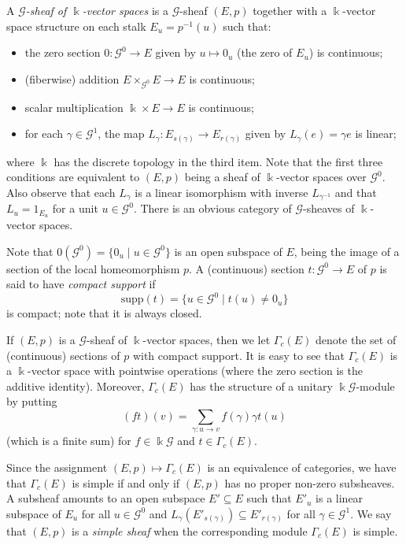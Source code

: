 \documentclass[11pt,reqno]{amsart}
\theoremstyle{plain}
\numberwithin{equation}{section}
\begin{document}
A \emph{$\mathscr G$-sheaf of $\Bbbk$-vector spaces} is a $\mathscr G$-sheaf $(E,p)$ together with a $\Bbbk$-vector space structure on each stalk $E_u=p^{-1}(u)$ such that:
\begin{itemize}
\item the zero section $0\colon \mathscr G^0\to E$ given by $u\mapsto 0_u$ (the zero of $E_u$) is continuous;
\item (fiberwise) addition $E\times_{\mathscr G^0} E\to E$ is continuous;
\item scalar multiplication $\Bbbk \times E\to E$ is continuous;
\item for each $\gamma\in \mathscr G^1$, the map $L_{\gamma}\colon E_{s(\gamma)}\to E_{r(\gamma)}$ given by $L_{\gamma}(e) = \gamma e$ is linear;
\end{itemize}
where $\Bbbk$ has the discrete topology in the third item.
Note that the first three conditions are equivalent to $(E,p)$ being a sheaf of $\Bbbk$-vector spaces over $\mathscr G^0$.  Also observe that each $L_{\gamma}$ is a linear isomorphism with inverse $L_{\gamma^{-1}}$ and that $L_u = 1_{E_u}$ for a unit $u\in \mathscr G^0$.  There is an obvious category of $\mathscr G$-sheaves of $\Bbbk$-vector spaces.

Note that $0(\mathscr G^0) = \{0_u\mid u\in \mathscr G^0\}$ is an open subspace of $E$, being the image of a section of the local homeomorphism $p$.  A (continuous) section $t\colon \mathscr G^0\to E$ of $p$ is said to have \emph{compact support} if \[\mathrm{supp}(t) =\{u\in \mathscr G^0\mid t(u)\neq 0_u\}\] is compact; note that it is always closed.

If $(E,p)$ is a $\mathscr G$-sheaf of $\Bbbk$-vector spaces, then we let $\Gamma_c(E)$ denote the set of  (continuous) sections of $p$ with compact support.  It is easy to see that $\Gamma_c(E)$ is a $\Bbbk$-vector space with pointwise operations (where the zero section is the additive identity).  Moreover, $\Gamma_c(E)$ has the structure of a unitary $\Bbbk \mathscr G$-module by putting
\begin{equation}\label{eq:module.action.sheaf}
(ft)(v) = \sum_{\gamma\colon u\to v} f(\gamma)\gamma t(u)
\end{equation}
 (which is a finite sum) for $f\in \Bbbk\mathscr G$ and $t\in \Gamma_c(E)$.

Since the assignment $(E,p)\mapsto \Gamma_c(E)$ is an equivalence of categories, we have that $\Gamma_c(E)$ is simple if and only if $(E,p)$ has no proper non-zero subsheaves.  A subsheaf amounts to an open subspace $E'\subseteq E$ such that $E'_u$ is a linear subspace of $E_u$ for all $u\in \mathscr G^0$ and $L_{\gamma}(E'_{s(\gamma)})\subseteq E'_{r(\gamma)}$ for all $\gamma\in \mathscr G^1$.  We say that $(E,p)$ is a \emph{simple sheaf} when the corresponding module $\Gamma_c(E)$ is simple.
\end{document}
